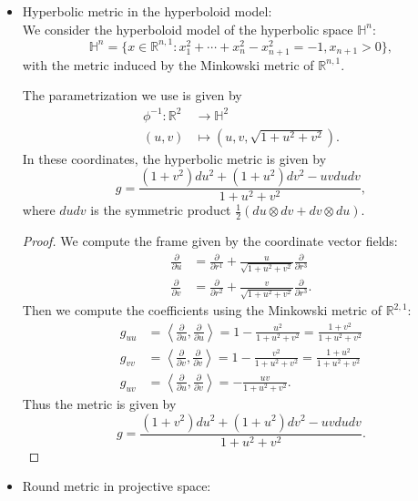 \documentclass{report}
\begin{document}
\begin{itemize}
    \item Hyperbolic metric in the hyperboloid model:\\
    We consider the hyperboloid model of the hyperbolic space $\mathbb H^n$:
    \[
    \mathbb H^n = \{x \in \mathbb R^{n,1}: x_1^2 + \cdots + x_n^2 - x_{n+1}^2 = -1, x_{n+1} > 0\},
    \]
    with the metric induced by the Minkowski metric of $\mathbb R^{n,1}$.
    
    The parametrization we use is given by
    \begin{align*}
        \phi^{-1}: \mathbb R^2 &\to \mathbb H^2\\
        (u,v) &\mapsto (u, v, \sqrt{1 + u^2 + v^2}).
    \end{align*}
    In these coordinates, the hyperbolic metric is given by
    \[
    g = \frac{(1 + v^2) du^2 + (1 + u^2) dv^2 - uv du dv}{1 + u^2 + v^2},
    \]
    where $du dv$ is the symmetric product $\frac{1}{2}(du \otimes dv + dv \otimes du)$.
    \begin{proof}
        We compute the frame given by the coordinate vector fields:
        \begin{align*}
            \frac{\partial}{\partial u} &= \frac{\partial}{\partial r^1} + \frac{u}{\sqrt{1 + u^2 + v^2}} \frac{\partial}{\partial r^3}\\
            \frac{\partial}{\partial v} &= \frac{\partial}{\partial r^2} + \frac{v}{\sqrt{1 + u^2 + v^2}} \frac{\partial}{\partial r^3}.
        \end{align*}
        Then we compute the coefficients using the Minkowski metric of $\mathbb R^{2,1}$:
    \begin{align*}
        g_{uu} &= \left\langle \frac{\partial}{\partial u}, \frac{\partial}{\partial u} \right\rangle = 1 - \frac{u^2}{1 + u^2 + v^2} = \frac{1 + v^2}{1 + u^2 + v^2}\\
        g_{vv} &= \left\langle \frac{\partial}{\partial v}, \frac{\partial}{\partial v} \right\rangle = 1 - \frac{v^2}{1 + u^2 + v^2} = \frac{1 + u^2}{1 + u^2 + v^2}\\
        g_{uv} &= \left\langle \frac{\partial}{\partial u}, \frac{\partial}{\partial v} \right\rangle = - \frac{uv}{1 + u^2 + v^2}.
    \end{align*}
    Thus the metric is given by
    \[
    g = \frac{(1 + v^2) du^2 + (1 + u^2) dv^2 - uv du dv}{1 + u^2 + v^2}.
    \]
    \end{proof}
    \item Round metric in projective space:\\

\end{itemize}
\end{document}
